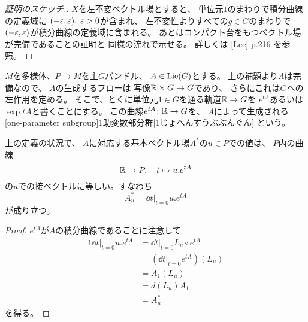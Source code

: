 \documentclass[report]{jlreq}
\begin{document}
\begin{proof}[証明のスケッチ.]
    $X$を左不変ベクトル場とすると、
    単位元$1$のまわりで積分曲線の定義域に
    $(-\varepsilon, \varepsilon), \; \varepsilon > 0$が含まれ、
    左不変性よりすべての$g \in G$のまわりで
    $(-\varepsilon, \varepsilon)$が積分曲線の定義域に含まれる。
    あとはコンパクト台をもつベクトル場が完備であることの証明と
    同様の流れで示せる。
    詳しくは [Lee] p.216 を参照。
\end{proof}

\begin{definition}[1助変数部分群]
    $M$を多様体、$P \to M$を主$G$バンドル、
    $A \in \operatorname{Lie}(G)$とする。
    上の補題より$A$は完備なので、
    $A$の生成するフローは
    {\smooth}写像$\mathbb{R} \times G \to G$であり、
    さらにこれは$G$への{\smooth}左作用を定める。
    そこで、とくに単位元$1 \in G$を通る軌道$\mathbb{R} \to G$を
    $e^{tA}$あるいは$\exp tA$と書くことにする。
    この曲線$e^{tA} \colon \mathbb{R} \to G$を、
    $A$によって生成される
    [one-parameter subgroup]{1助変数部分群}[1じょへんすうぶぶんぐん]
    という。
\end{definition}

\begin{proposition}[基本ベクトル場の幾何学的意味]
    上の定義の状況で、
    $A$に対応する基本ベクトル場$A^*$の$u \in P$での値は、
    $P$内の曲線
    \begin{equation}
        \mathbb{R} \to P, \quad
        t \mapsto u . e^{tA}
    \end{equation}
    の$u$での接ベクトルに等しい。すなわち
    \begin{equation}
        A^*_u = \dd{t}\Big|_{t = 0} u . e^{tA}
    \end{equation}
    が成り立つ。
\end{proposition}

\begin{proof}
    $e^{tA}$が$A$の積分曲線であることに注意して
    \begin{alignat}{1}
        \dd{t}\Big|_{t = 0} u . e^{tA}
            &= \dd{t}\Big|_{t = 0} L_u \circ e^{tA} \\
            &= \left(
                \dd{t}\Big|_{t = 0} e^{tA}
            \right) (L_u) \\
            &= A_1 (L_u) \\
            &= d(L_u) A_1 \\
            &= A^*_u
    \end{alignat}
    を得る。
\end{proof}
\end{document}
